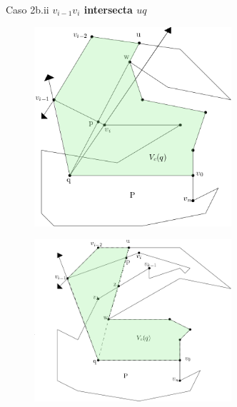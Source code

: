 \documentclass[aspectratio=169,xcolor=dvipsnames, t]{beamer}
\begin{document}
\begin{frame}{Caso 2b.ii}
    \textbf{$v_{i-1}v_{i}$ intersecta $uq$}\\ 
    \begin{figure}
            \centering
            \includegraphics[width=0.65\textwidth]{imagenes/Caso2.7a.png}
    \end{figure}
    \begin{figure}
            \centering
            \includegraphics[width=0.65\textwidth]{imagenes/Caso2.7b.png}
    \end{figure}
\end{frame}
\end{document}
